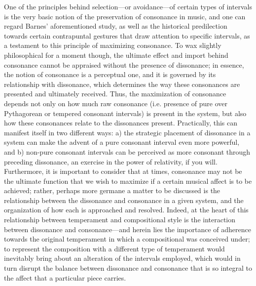 One of the principles behind selection---or avoidance---of
certain types of intervals is the very basic notion of the preservation
of consonance in music, and one can regard Barnes' aforementioned study,
as well as the historical predilection towards certain contrapuntal
gestures that draw attention to specific intervals, as a testament to
this principle of maximizing consonance. To wax slightly philosophical
for a moment though, the ultimate effect and import behind consonance
cannot be appraised without the presence of dissonance; in essence, the
notion of consonance is a perceptual one, and it is governed by its
relationship with dissonance, which determines the way these consonances
are presented and ultimately received. Thus, the maximization of
consonance depends not only on how much raw consonance (i.e. presence of
pure over Pythagorean or tempered consonant intervals) is present in the
system, but also how these consonances relate to the dissonances
present. Practically, this can manifest itself in two different ways: a)
the strategic placement of dissonance in a system can make the advent of
a pure consonant interval even more powerful, and b) non-pure consonant
intervals can be perceived as more consonant through preceding
dissonance, an exercise in the power of relativity, if you will.
Furthermore, it is important to consider that at times, consonance may
not be the ultimate function that we wish to maximize if a certain
musical affect is to be achieved; rather, perhaps more germane a matter
to be discussed is the relationship between the dissonance and
consonance in a given system, and the organization of how each is
approached and resolved. Indeed, at the heart of this relationship
between temperament and compositional style is the interaction between
dissonance and consonance---and herein lies the importance of adherence
towards the original temperament in which a compositional was conceived
under; to represent the composition with a different type of temperament
would inevitably bring about an alteration of the intervals employed,
which would in turn disrupt the balance between dissonance and
consonance that is so integral to the affect that a particular piece
carries.

